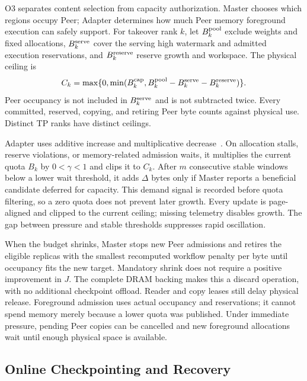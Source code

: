 O3 separates content selection from capacity authorization. Master
chooses which regions occupy Peer; Adapter determines how much Peer
memory foreground execution can safely support. For takeover rank $k$,
let $B^{\rm pool}_k$ exclude weights and fixed allocations,
$B^{\rm serve}_k$ cover the serving high watermark and admitted execution
reservations, and $B^{\rm reserve}_k$ reserve growth and workspace.
The physical ceiling is
\begin{equation}
 C_k=\max\{0,\min(B^{\rm cap}_k,
 B^{\rm pool}_k-B^{\rm serve}_k-B^{\rm reserve}_k)\}.
 \label{eq:teacher-ceiling}
\end{equation}
Peer occupancy is not included in $B^{\rm serve}_k$ and is not subtracted
twice. Every committed, reserved, copying, and retiring Peer byte counts
against physical use. Distinct TP ranks have distinct ceilings.

Adapter uses additive increase and multiplicative
decrease~\cite{chiu1989aimd}. On allocation stalls, reserve violations,
or memory-related admission waits, it multiplies the current quota
$B_k$ by $0<\gamma<1$ and clips it to $C_k$. After $m$ consecutive
stable windows below a lower wait threshold, it adds $\Delta$ bytes
only if Master reports a beneficial candidate deferred for capacity.
This demand signal is recorded before quota filtering, so a zero quota
does not prevent later growth. Every update is page-aligned and clipped
to the current ceiling; missing telemetry disables growth. The gap
between pressure and stable thresholds suppresses rapid oscillation.

When the budget shrinks, Master stops new Peer admissions and retires
the eligible replicas with the smallest recomputed workflow penalty
per byte until occupancy fits the new target. Mandatory shrink does
not require a positive improvement in $J$. The complete DRAM backing
makes this a discard operation, with no additional checkpoint offload.
Reader and copy leases still delay physical release. Foreground
admission uses actual occupancy and reservations; it cannot spend
memory merely because a lower quota was published. Under immediate
pressure, pending Peer copies can be cancelled and new foreground
allocations wait until enough physical space is available.

\subsection{Online Checkpointing and Recovery}
\label{sec:teacher-execution}

